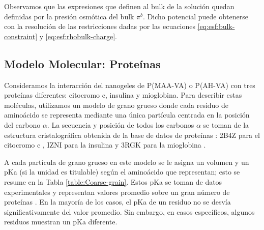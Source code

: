 Observamos que las expresiones que definen al bulk de la soluci\'on quedan definidas por la presi\'on osm\'otica del bulk $\pi^b$. Dicho potencial puede obtenerse con la resoluci\'on de las restricciones dadas por las  ecuaciones  \ref{eq:esf:bulk-constraint} y \ref{eq:esf:rhobulk-charge}.



\subsection{Modelo Molecular: Prote\'inas}\label{subsec:protein}



Consideramos la interacci\'on del nanogeles de P(MAA-VA) o P(AH-VA) con tres prote\'inas diferentes: citocromo c, insulina y mioglobina.
Para describir estas mol\'eculas, utilizamos un modelo de grano grueso donde cada residuo de amino\'acido se representa mediante una \'unica part\'icula centrada en la posici\'on del carbono $\alpha$.
La secuencia y posici\'on de todos los carbonos $\alpha$ se toman de la estructura cristalogr\'afica obtenida de la base de datos de prote\'inas \cite{berman2000protein}: 2B4Z para el citocromo c \cite{mirkin2008high}, IZNI para la insulina \cite{bentley1976structure} y 3RGK para la mioglobina \cite{hubbard1990x}.

A cada part\'icula de grano grueso en este modelo se le asigna un volumen y un pKa (si la unidad es titulable) seg\'un el amino\'acido que representan; esto se resume en la Tabla \ref{table:Coarse-grain}.
Estos pKa se toman de datos experimentales y representan valores promedio sobre un gran n\'umero de prote\'inas \cite{grimsley2009summary}.
En la mayor\'ia de los casos, el pKa de un residuo no se desv\'ia significativamente del valor promedio.
Sin embargo, en casos espec\'ificos, algunos residuos muestran un pKa diferente.


